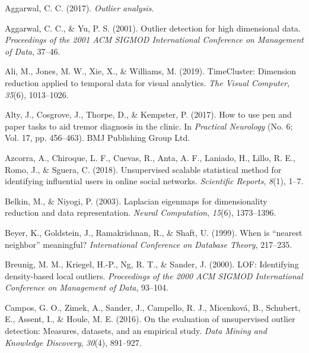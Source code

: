 \documentclass[
  10pt]{article}
\newlength{\cslhangindent}
\newlength{\cslentryspacingunit} %
\newenvironment{CSLReferences}[2] %
 {%
  \setlength{\parindent}{0pt}
  \ifodd #1
  \let\oldpar\par
  \def\par{\hangindent=\cslhangindent\oldpar}
  \fi
  \setlength{\parskip}{#2\cslentryspacingunit}
 }%
 {}
\begin{document}
\hypertarget{refs}{}
\begin{CSLReferences}{1}{0}
\leavevmode{}%
Aggarwal, C. C. (2017). \emph{Outlier analysis}.

\leavevmode{}%
Aggarwal, C. C., \& Yu, P. S. (2001). Outlier detection for high dimensional data. \emph{Proceedings of the 2001 ACM SIGMOD International Conference on Management of Data}, 37--46.

\leavevmode{}%
Ali, M., Jones, M. W., Xie, X., \& Williams, M. (2019). Time{C}luster: Dimension reduction applied to temporal data for visual analytics. \emph{The Visual Computer}, \emph{35}(6), 1013--1026.

\leavevmode{}%
Alty, J., Cosgrove, J., Thorpe, D., \& Kempster, P. (2017). How to use pen and paper tasks to aid tremor diagnosis in the clinic. In \emph{Practical Neurology} (No. 6; Vol. 17, pp. 456--463). BMJ Publishing Group Ltd.

\leavevmode{}%
Azcorra, A., Chiroque, L. F., Cuevas, R., Anta, A. F., Laniado, H., Lillo, R. E., Romo, J., \& Sguera, C. (2018). Unsupervised scalable statistical method for identifying influential users in online social networks. \emph{Scientific Reports}, \emph{8}(1), 1--7.

\leavevmode{}%
Belkin, M., \& Niyogi, P. (2003). Laplacian eigenmaps for dimensionality reduction and data representation. \emph{Neural Computation}, \emph{15}(6), 1373--1396.

\leavevmode{}%
Beyer, K., Goldstein, J., Ramakrishnan, R., \& Shaft, U. (1999). When is {``nearest neighbor''} meaningful? \emph{International Conference on Database Theory}, 217--235.

\leavevmode{}%
Breunig, M. M., Kriegel, H.-P., Ng, R. T., \& Sander, J. (2000). {LOF}: Identifying density-based local outliers. \emph{Proceedings of the 2000 ACM SIGMOD International Conference on Management of Data}, 93--104.

\leavevmode{}%
Campos, G. O., Zimek, A., Sander, J., Campello, R. J., Micenková, B., Schubert, E., Assent, I., \& Houle, M. E. (2016). On the evaluation of unsupervised outlier detection: Measures, datasets, and an empirical study. \emph{Data Mining and Knowledge Discovery}, \emph{30}(4), 891--927.


\end{CSLReferences}
\end{document}
